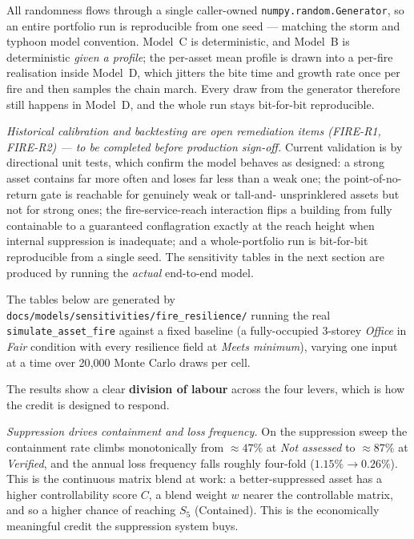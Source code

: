 \documentclass[11pt,a4paper]{article}
\begin{document}
All randomness flows through a single caller-owned
\texttt{numpy.random.Generator}, so an entire portfolio run is reproducible from
one seed --- matching the storm and typhoon model convention. Model~C is
deterministic, and Model~B is deterministic \emph{given a profile}; the per-asset
mean profile is drawn into a per-fire realisation inside Model~D, which jitters
the bite time and growth rate once per fire and then samples the chain march.
Every draw from the generator therefore still happens in Model~D, and the whole
run stays bit-for-bit reproducible.

\mkmvalidation

\textit{Historical calibration and backtesting are open remediation items
(FIRE-R1, FIRE-R2) --- to be completed before production sign-off.} Current
validation is by directional unit tests, which confirm the model behaves as
designed: a strong asset contains far more often and loses far less than a weak
one; the point-of-no-return gate is reachable for genuinely weak or tall-and-
unsprinklered assets but not for strong ones; the fire-service-reach interaction
flips a building from fully containable to a guaranteed conflagration exactly at
the reach height when internal suppression is inadequate; and a whole-portfolio
run is bit-for-bit reproducible from a single seed. The sensitivity tables in
the next section are produced by running the \emph{actual} end-to-end model.

\mkmtestresults

\mkmsensitivity

The tables below are generated by
\texttt{docs/models/sensitivities/fire\_resilience/} running the real
\texttt{simulate\_asset\_fire} against a fixed baseline (a fully-occupied
3-storey \emph{Office} in \emph{Fair} condition with every resilience field at
\emph{Meets minimum}), varying one input at a time over
20{,}000 Monte Carlo draws per cell.

The results show a clear \textbf{division of labour} across the four levers,
which is how the credit is designed to respond.

\emph{Suppression drives containment and loss frequency.} On the suppression
sweep the containment rate climbs monotonically from $\approx 47\%$ at
\emph{Not assessed} to $\approx 87\%$ at \emph{Verified}, and the annual loss
frequency falls roughly four-fold ($1.15\% \to 0.26\%$). This is the continuous
matrix blend at work: a better-suppressed asset has a higher controllability
score $C$, a blend weight $w$ nearer the controllable matrix, and so a higher
chance of reaching $S_5$ (Contained). This is the economically meaningful credit
the suppression system buys.
\end{document}
